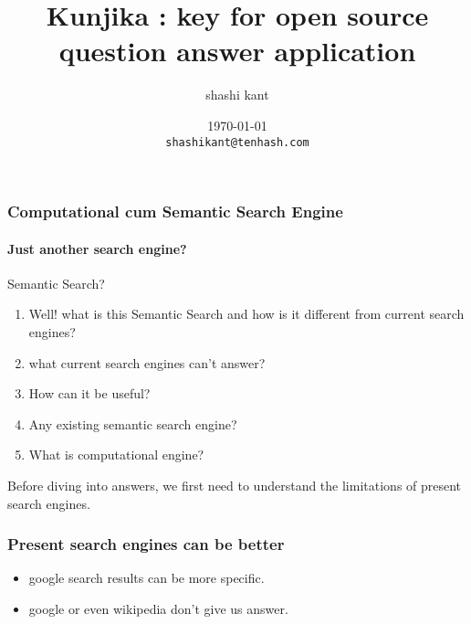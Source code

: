\documentclass{beamer}
\title{Kunjika : key for open source question answer application}
\author{shashi kant}
\date{\today \\ \texttt{shashikant@tenhash.com}}
\institute{Department of Computer Science \& Engineering \\ National Institute of Technology, Jamshedpur}
\begin{document}
\maketitle
\begin{frame}
   \titlepage
\end{frame}

\begin{frame}
 \frametitle{Computational cum Semantic Search Engine}
 \framesubtitle{Just another search engine?}
 \begin{block}{Semantic Search?} \pause
 \begin{enumerate}
   \item  Well! what is this \alert{Semantic Search} and how is it different from current search engines?
   \pause
   \item what current search engines can't answer?
   \pause
   \item How can it be useful?
   \pause
   \item Any existing semantic search engine?
   \pause
   \item What is computational engine?
  \end{enumerate}
 \pause
 \end{block}

 Before diving into answers, we first need to understand the limitations of present search engines.


\end{frame}

\begin{frame}[t]

 \frametitle{Present search engines can be better}
 \pause
 \begin{itemize}
  \item google search results can be more specific.
  \pause
  \item google or even wikipedia don't give us answer.
 \end{itemize}
\end{frame}


\end{document}
